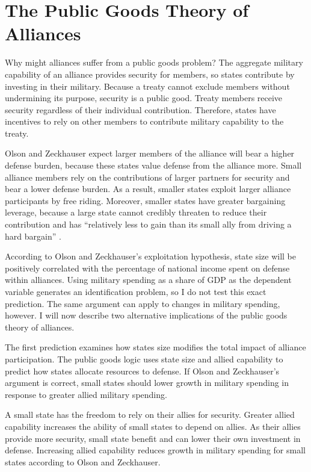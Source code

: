 \documentclass[12pt]{article}
\begin{document}
\section{The Public Goods Theory of Alliances}

Why might alliances suffer from a public goods problem? 
The aggregate military capability of an alliance provides security for members, so states contribute by investing in their military.
Because a treaty cannot exclude members without undermining its purpose, security is a public good. 
Treaty members receive security regardless of their individual contribution. 
Therefore, states have incentives to rely on other members to contribute military capability to the treaty. 

 
Olson and Zeckhauser expect larger members of the alliance will bear a higher defense burden, because these states value defense from the alliance more. 
Small alliance members rely on the contributions of larger partners for security and bear a lower defense burden.
As a result, smaller states exploit larger alliance participants by free riding. 
Moreover, smaller states have greater bargaining leverage, because a large state cannot credibly threaten to reduce their contribution and has ``relatively less to gain than its small ally from driving a hard bargain'' \citep[pg. 274]{OlsonZeckhauser1966}. 


According to Olson and Zeckhauser's exploitation hypothesis, state size will be positively correlated with the percentage of national income spent on defense within alliances.
Using military spending as a share of GDP as the dependent variable generates an identification problem, so I do not test this exact prediction. 
The same argument can apply to changes in military spending, however. 
I will now describe two alternative implications of the public goods theory of alliances. 


The first prediction examines how states size modifies the total impact of alliance participation. 
The public goods logic uses state size and allied capability to predict how states allocate resources to defense. 
If Olson and Zeckhauser's argument is correct, small states should lower growth in military spending in response to greater allied military spending. 


A small state has the freedom to rely on their allies for security. 
Greater allied capability increases the ability of small states to depend on allies. 
As their allies provide more security, small state benefit and can lower their own investment in defense. 
Increasing allied capability reduces growth in military spending for small states according to Olson and Zeckhauser.
\end{document}
